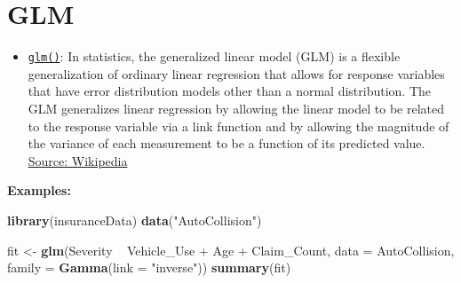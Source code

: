 \documentclass[]{book}
\newenvironment{Shaded}{\begin{snugshade}}{\end{snugshade}}
\newcommand{\KeywordTok}[1]{\textcolor[rgb]{0.13,0.29,0.53}{\textbf{{#1}}}}
\newcommand{\DataTypeTok}[1]{\textcolor[rgb]{0.13,0.29,0.53}{{#1}}}
\newcommand{\StringTok}[1]{\textcolor[rgb]{0.31,0.60,0.02}{{#1}}}
\newcommand{\NormalTok}[1]{{#1}}
\providecommand{\tightlist}{%
  \setlength{\itemsep}{0pt}\setlength{\parskip}{0pt}}
\begin{document}
\section{\texorpdfstring{\textbf{GLM}}{GLM}}\label{glm}

\begin{itemize}
\tightlist
\item
  \href{http://www.statmethods.net/advstats/glm.html}{\texttt{glm()}}:
  In statistics, the generalized linear model (GLM) is a flexible
  generalization of ordinary linear regression that allows for response
  variables that have error distribution models other than a normal
  distribution. The GLM generalizes linear regression by allowing the
  linear model to be related to the response variable via a link
  function and by allowing the magnitude of the variance of each
  measurement to be a function of its predicted value.
  \href{https://en.wikipedia.org/wiki/Generalized_linear_model}{Source:
  Wikipedia}
\end{itemize}

\textbf{Examples: }

\begin{Shaded}
\begin{Highlighting}[]
\KeywordTok{library}\NormalTok{(insuranceData)}
\KeywordTok{data}\NormalTok{(}\StringTok{"AutoCollision"}\NormalTok{)}

\NormalTok{fit <-}\StringTok{ }\KeywordTok{glm}\NormalTok{(Severity ~}\StringTok{ }\NormalTok{Vehicle_Use +}\StringTok{ }\NormalTok{Age +}\StringTok{ }\NormalTok{Claim_Count, }\DataTypeTok{data =} \NormalTok{AutoCollision, }\DataTypeTok{family =} \KeywordTok{Gamma}\NormalTok{(}\DataTypeTok{link =} \StringTok{"inverse"}\NormalTok{))}
\KeywordTok{summary}\NormalTok{(fit)}
\end{Highlighting}
\end{Shaded}
\end{document}
